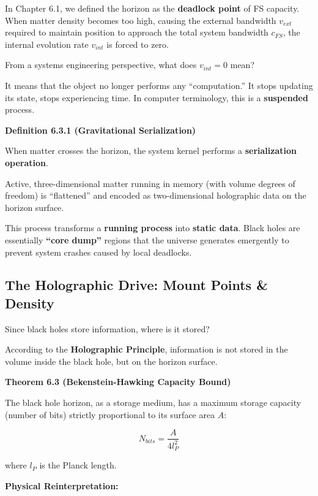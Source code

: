 \documentclass[11pt,a4paper,twoside]{book}
\begin{document}
In Chapter 6.1, we defined the horizon as the \textbf{deadlock point} of FS capacity. When matter density becomes too high, causing the external bandwidth \textbf{$v_{ext}$} required to maintain position to approach the total system bandwidth \textbf{$c_{FS}$}, the internal evolution rate \textbf{$v_{int}$} is forced to zero.

From a systems engineering perspective, what does \textbf{$v_{int} = 0$} mean?

It means that the object no longer performs any ``computation.'' It stops updating its state, stops experiencing time. In computer terminology, this is a \textbf{suspended} process.

\textbf{Definition 6.3.1 (Gravitational Serialization)}

When matter crosses the horizon, the system kernel performs a \textbf{serialization operation}.

Active, three-dimensional matter running in memory (with volume degrees of freedom) is ``flattened'' and encoded as two-dimensional holographic data on the horizon surface.

This process transforms a \textbf{running process} into \textbf{static data}. Black holes are essentially \textbf{``core dump''} regions that the universe generates emergently to prevent system crashes caused by local deadlocks.

\subsection{The Holographic Drive: Mount Points \& Density}

Since black holes store information, where is it stored?

According to the \textbf{Holographic Principle}, information is not stored in the volume inside the black hole, but on the horizon surface.

\textbf{Theorem 6.3 (Bekenstein-Hawking Capacity Bound)}

The black hole horizon, as a storage medium, has a maximum storage capacity (number of bits) strictly proportional to its surface area \textbf{$A$}:

$$N_{bits} = \frac{A}{4 l_P^2}$$

where \textbf{$l_P$} is the Planck length.

\textbf{Physical Reinterpretation:}
\end{document}

